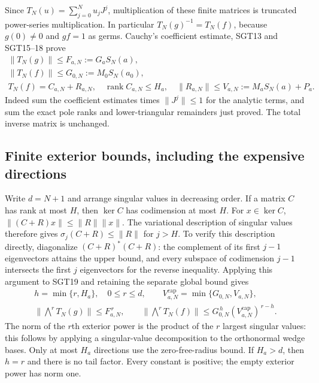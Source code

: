 \documentclass[11pt,a4paper]{article}
\begin{document}
Since $T_N(u)=\sum_{j=0}^Nu_jJ^j$, multiplication of these finite
matrices is truncated power-series multiplication. In particular
$T_N(g)^{-1}=T_N(f)$, because $g(0)\ne0$ and $gf=1$ as germs.
Cauchy's coefficient estimate, SGT13 and SGT15--18 prove
\[
\begin{gathered}
 \|T_N(g)\|\le F_{a,N}:=G_aS_N(a),\\
 \|T_N(f)\|\le G_{0,N}:=M_0S_N(a_0),\\
 T_N(f)=C_{a,N}+R_{a,N},\quad
 \operatorname{rank}C_{a,N}\le H_a,\quad
 \|R_{a,N}\|\le V_{a,N}:=M_aS_N(a)+P_a.
\end{gathered}\tag{SGT19}
\]
Indeed sum the coefficient estimates times $\|J^j\|\le1$ for the
analytic terms, and sum the exact pole ranks and lower-triangular
remainders just proved. The total inverse matrix is unchanged.

\subsection{Finite exterior bounds, including the expensive directions}

Write $d=N+1$ and arrange singular values in decreasing order.
If a matrix $C$ has rank at most $H$, then $\ker C$ has codimension
at most $H$. For $x\in\ker C$, $\|(C+R)x\|\le\|R\|\|x\|$.
The variational description of singular values therefore gives
$\sigma_j(C+R)\le\|R\|$ for $j>H$. To verify this description
directly, diagonalize $(C+R)^*(C+R)$: the complement of its first
$j-1$ eigenvectors attains the upper bound, and every subspace of
codimension $j-1$ intersects the first $j$ eigenvectors for the
reverse inequality. Applying this argument to SGT19 and retaining
the separate global bound gives
\[
\begin{gathered}
 h=\min\{r,H_a\},\quad 0\le r\le d,\qquad
 V_{a,N}^{\mathrm{cap}}=\min\{G_{0,N},V_{a,N}\},\\
 \|\bigwedge^rT_N(g)\|\le F_{a,N}^{\,r},\qquad
 \|\bigwedge^rT_N(f)\|
       \le G_{0,N}^{\,h}(V_{a,N}^{\mathrm{cap}})^{\,r-h}.
\end{gathered}\tag{SGT20}
\]
The norm of the $r$th exterior power is the product of the $r$
largest singular values: this follows by applying a singular-value
decomposition to the orthonormal wedge bases. Only at most $H_a$
directions use the zero-free-radius bound. If $H_a>d$, then
$h=r$ and there is no tail factor. Every constant is positive;
the empty exterior power has norm one.
\end{document}
